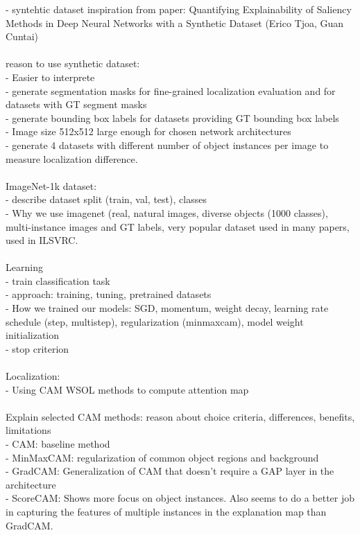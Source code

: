 - syntehtic dataset inspiration from paper: Quantifying Explainability of Saliency Methods in Deep Neural Networks with a Synthetic Dataset (Erico Tjoa, Guan Cuntai)\\
\\
reason to use synthetic dataset:\\
- Easier to interprete\\
- generate segmentation masks for fine-grained localization evaluation and for datasets with GT segment masks\\
- generate bounding box labels for datasets providing GT bounding box labels\\
- Image size 512x512 large enough for chosen network architectures\\
- generate 4 datasets with different number of object instances per image to measure localization difference.\\
\\
ImageNet-1k dataset:\\
- describe dataset split (train, val, test), classes\\
- Why we use imagenet (real, natural images, diverse objects (1000 classes), multi-instance images and GT labels, very popular dataset used in many papers, used in ILSVRC.\\
\\
Learning\\
- train classification task\\
- approach: training, tuning, pretrained datasets\\
- How we trained our models: SGD, momentum, weight decay, learning rate schedule (step, multistep), regularization (minmaxcam), model weight initialization\\
- stop criterion\\
\\
Localization:\\
- Using CAM WSOL methods to compute attention map\\
\\
Explain selected CAM methods: reason about choice criteria, differences, benefits, limitations\\
- CAM: baseline method\\
- MinMaxCAM: regularization of common object regions and background\\
- GradCAM: Generalization of CAM that doesn’t require a GAP layer in the architecture\\
- ScoreCAM: Shows more focus on object instances. Also seems to do a better job in capturing the features of multiple instances in the explanation map than GradCAM.\\
